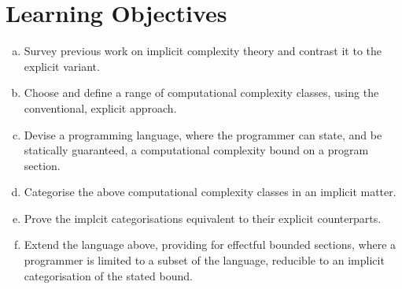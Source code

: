 
\section{Learning Objectives}

\begin{enumerate}[(a)]

\item Survey previous work on implicit complexity theory and contrast it to the
explicit variant. \label{survey}

\item Choose and define a range of computational complexity classes, using the
conventional, explicit approach.

\item Devise a programming language, where the programmer can state, and be
statically guaranteed, a computational complexity bound on a program section.
\label{language}

\item Categorise the above computational complexity classes in an implicit
matter. \label{categorise}

\item Prove the implcit categorisations equivalent to their explicit
counterparts.

\item Extend the language above, providing for effectful bounded sections,
where a programmer is limited to a subset of the language, reducible to an
implicit categorisation of the stated bound. \label{extend}

\end{enumerate}
